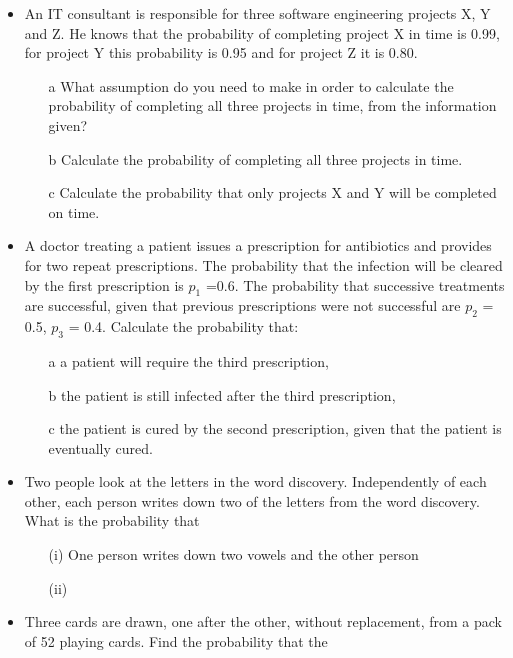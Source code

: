 \documentclass[12pt]{report}
\begin{document}
{\begin{itemize}
	\item An IT consultant is responsible for three software engineering projects X, Y and Z.
	He knows that the probability of completing project X in time is 0.99, for project Y this probability is 0.95
	and for project Z it is 0.80.
	
	\begin{itemize}
		\item[a] What assumption do you need to make in order to calculate the probability
		of completing all three projects in time, from the information given?
		\item[b] Calculate the probability of completing all three projects in time.
		\item[c] Calculate the probability that only projects X and Y will be completed on time.
	\end{itemize}
	
	\item A doctor treating a patient issues a prescription for antibiotics and provides for two repeat prescriptions. The probability that the infection will be cleared by the first prescription is $p_1$ =0.6.
	The probability that successive treatments are successful, given that previous prescriptions were not successful are $p_2$ = 0.5, $p_3$ = 0.4. Calculate the probability that:
	
	\begin{itemize}
		\item[a] a patient will require the third prescription,
		\item[b] the patient is still infected after the third prescription,
		\item[c] the patient is cured by the second prescription, given that the patient is eventually cured.
	\end{itemize}
	
	\item Two people look at the letters in the word discovery. Independently of each other, each person writes down two of the letters from the word discovery.
	What is the probability that
	\begin{itemize}
		\item[(i)] One person writes down two vowels and the other person 
		\item[(ii)]
	\end{itemize}
	
	\item Three cards are drawn, one after the other, without replacement, from a pack of 52 playing cards.
	Find the probability that the
	

\end{itemize}}
\end{document}
